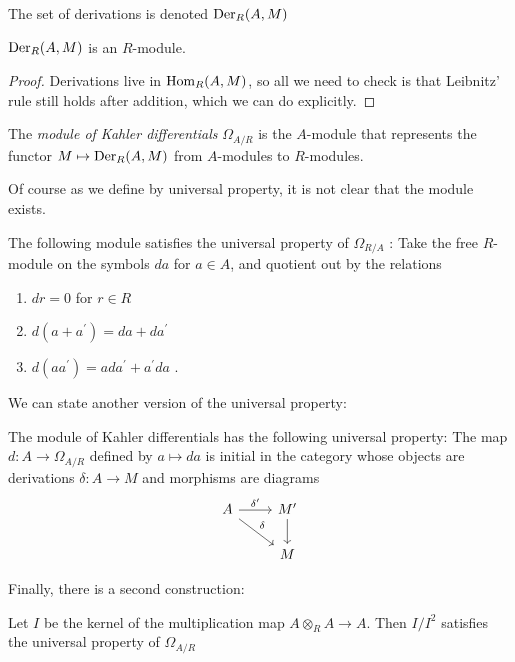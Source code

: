 The set of derivations is denoted \(\operatorname{Der}_{R}(A,M)\)

\begin{lem}
	\(\operatorname{Der}_{R}(A,M)\) is an \(R\)-module.
\end{lem}

\begin{proof}
	Derivations live in \(\operatorname{Hom}_{R} (A,M)\),
	so all we need to check is that 
	Leibnitz' rule still holds after addition,
	which we can do explicitly.
\end{proof}

\begin{defn}
	The \textit{module of Kahler differentials}
	\(\Omega_{A / R}\) is the \(A\)-module that represents
	the functor \(M \mapsto \operatorname{Der}_{R}(A,M)\) 
	from \(A\)-modules to \(R\)-modules.
\end{defn}

Of course as we define by universal property,
it is not clear that the module exists.

\begin{lem}
	The following module satisfies the universal property 
	of \(\Omega_{R / A}\) :
	Take the free \(R\)-module on the symbols 
	\(da\) for \(a \in A\), and quotient
	out by the relations
	\begin{enumerate}[(1)]
		\item \(dr = 0\) for \(r \in R\) 
		\item \(d(a + a^{\prime}) = da + da^{\prime}\)
		\item \(d(aa^{\prime}) = 
			ada^{\prime} + a^{\prime}da\)
	.\end{enumerate}
\end{lem}

We can state another version of the universal property:

\begin{lem}
	The module of Kahler differentials has the following
	universal property: 
	The map \(d : A \to \Omega_{A / R}\) 
	defined by \(a \mapsto da\)
	is initial in
	the category whose objects are 
	derivations \(\delta : A \to M\) and
	morphisms are diagrams
	\[
	\begin{tikzcd}
	A \arrow{r}{\delta^{\prime}} \arrow{rd}{\delta} & 
	M^{\prime} \arrow{d}{} \\
	& M
	\end{tikzcd}
	\]
\end{lem}

Finally, there is a second construction:
\begin{lem}
	Let \(I\) be the kernel of the multiplication
	map \(A \otimes_{R} A \to A\).
	Then \(I / I^{2}\) 
	satisfies the universal property of \(\Omega_{A / R}\)
\end{lem}

